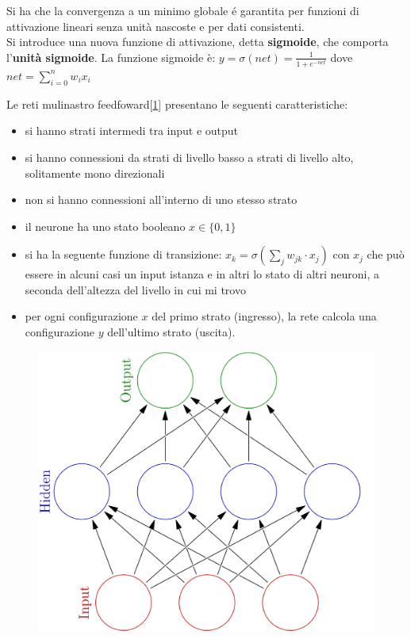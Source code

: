 Si ha che la convergenza a un minimo globale é garantita per funzioni di attivazione lineari senza unità nascoste e per dati consistenti. \\
Si introduce una nuova funzione di attivazione, detta \textbf{sigmoide}, che comporta l'\textbf{unità sigmoide}. La funzione sigmoide è: $y=\sigma(net)=\displaystyle \frac{1}{1+e^{-net}}$ dove $net = \displaystyle\sum_{i = 0}^n w_ix_i$

Le reti mulinastro feedfoward[\ref{fig:my_label}] presentano le seguenti caratteristiche:
\begin{itemize}
    \item si hanno strati intermedi tra input e output 
    \item si hanno connessioni da strati di livello basso a strati di livello alto, solitamente mono direzionali 
    \item non si hanno connessioni all'interno di uno stesso strato 
    \item il neurone ha uno stato booleano $x\in\{0,1\}$ 
    \item si ha la seguente funzione di transizione: $x_k=\displaystyle \sigma\left(\sum_{j}w_{jk}\cdot x_j\right)$ con $x_j$ che può essere in alcuni casi un input istanza e in altri lo stato di altri neuroni, a seconda dell'altezza del livello in cui mi trovo 
    \item per ogni configurazione $x$ del primo strato (ingresso), la rete calcola una configurazione $y$ dell'ultimo strato (uscita). 
\end{itemize}

\begin{figure}[H]
    \centering
    \includegraphics[scale = 0.2]{imm/colored_neural_network-1200x1443.png}
    \label{fig:my_label}
\end{figure}

